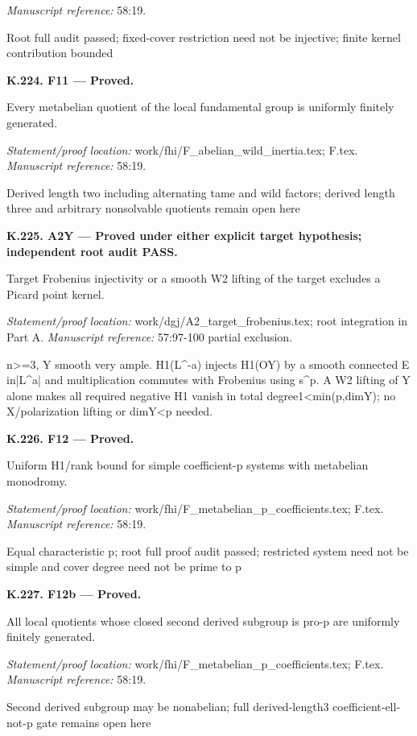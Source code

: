 \emph{Manuscript reference:} 58:19.
\par Root full audit passed; fixed-cover restriction need not be injective; finite kernel contribution bounded
\par\medskip\noindent\textbf{K.224. F11 --- Proved.}\par
Every metabelian quotient of the local fundamental group is uniformly finitely generated.
\par\emph{Statement/proof location:} work/fhi/F\_abelian\_wild\_inertia.tex; F.tex.
\emph{Manuscript reference:} 58:19.
\par Derived length two including alternating tame and wild factors; derived length three and arbitrary nonsolvable quotients remain open here
\par\medskip\noindent\textbf{K.225. A2Y --- Proved under either explicit target hypothesis; independent root audit PASS.}\par
Target Frobenius injectivity or a smooth W2 lifting of the target excludes a Picard point kernel.
\par\emph{Statement/proof location:} work/dgj/A2\_target\_frobenius.tex; root integration in Part A.
\emph{Manuscript reference:} 57:97-100 partial exclusion.
\par n>=3, Y smooth very ample. H1(L\textasciicircum{}-a) injects H1(OY) by a smooth connected E in|L\textasciicircum{}a| and multiplication commutes with Frobenius using s\textasciicircum{}p. A W2 lifting of Y alone makes all required negative H1 vanish in total degree1<min(p,dimY); no X/polarization lifting or dimY<p needed.
\par\medskip\noindent\textbf{K.226. F12 --- Proved.}\par
Uniform H1/rank bound for simple coefficient-p systems with metabelian monodromy.
\par\emph{Statement/proof location:} work/fhi/F\_metabelian\_p\_coefficients.tex; F.tex.
\emph{Manuscript reference:} 58:19.
\par Equal characteristic p; root full proof audit passed; restricted system need not be simple and cover degree need not be prime to p
\par\medskip\noindent\textbf{K.227. F12b --- Proved.}\par
All local quotients whose closed second derived subgroup is pro-p are uniformly finitely generated.
\par\emph{Statement/proof location:} work/fhi/F\_metabelian\_p\_coefficients.tex; F.tex.
\emph{Manuscript reference:} 58:19.
\par Second derived subgroup may be nonabelian; full derived-length3 coefficient-ell-not-p gate remains open here
